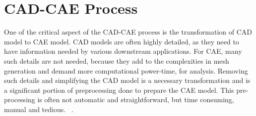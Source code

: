 \section{CAD-CAE Process} \label{sec:intro:cadcae}


One of the critical aspect of the CAD-CAE process is the transformation of CAD model to CAE model. CAD models are often highly detailed, as they need to have information needed by various downstream applications. For CAE, many such details are not needed, because they add to the complexities in mesh generation and demand more computational power-time, for analysis. Removing such details and simplifying the CAD model is a necessary transformation and is a significant portion of preprocessing done to prepare the CAE model. This pre-processing is often not automatic and straightforward, but time consuming, manual and tedious.
~\cite{Halpern1997}. 
